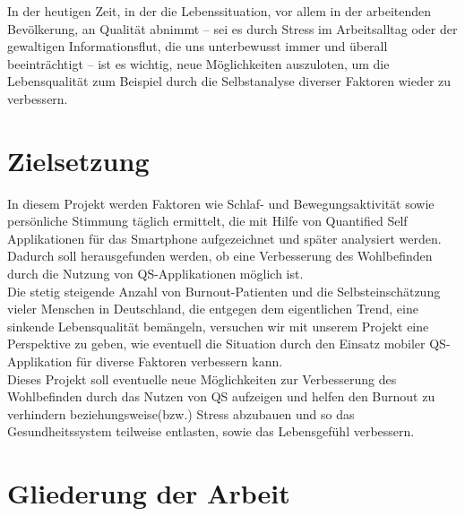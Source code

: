 In der heutigen Zeit, in der die Lebenssituation, vor allem in der arbeitenden Bevölkerung, an Qualität abnimmt – sei es durch Stress im Arbeitsalltag oder der gewaltigen Informationsflut, die uns unterbewusst immer und überall beeinträchtigt – ist es wichtig, neue Möglichkeiten auszuloten, um die Lebensqualität zum Beispiel durch die Selbstanalyse diverser Faktoren wieder zu verbessern.  

\section{Zielsetzung}
\label{ch:Einleitung:sec:Zielsetzung}

In diesem Projekt werden Faktoren wie Schlaf- und Bewegungsaktivität sowie persönliche Stimmung täglich ermittelt, die mit Hilfe von Quantified Self Applikationen für das Smartphone aufgezeichnet und später analysiert werden. \\
Dadurch soll herausgefunden werden, ob eine Verbesserung des Wohlbefinden durch die Nutzung von QS-Applikationen möglich ist. \\
Die stetig steigende Anzahl von Burnout-Patienten\cite[Oberlander]{Oberlander:Burnout} und die Selbsteinschätzung vieler Menschen in Deutschland, die entgegen dem eigentlichen Trend, eine sinkende Lebensqualität bemängeln, versuchen wir mit unserem Projekt eine Perspektive zu geben, wie eventuell die Situation durch den Einsatz mobiler QS-Applikation für diverse Faktoren verbessern kann. \\
Dieses Projekt soll eventuelle neue Möglichkeiten zur Verbesserung des Wohlbefinden durch das Nutzen von QS aufzeigen und helfen den Burnout zu verhindern beziehungsweise(bzw.) Stress abzubauen und so das Gesundheitssystem teilweise entlasten, sowie das Lebensgefühl verbessern. 

\section{Gliederung der Arbeit}
\label{ch:Einleitung:sec:GliederungDerArbeit}

